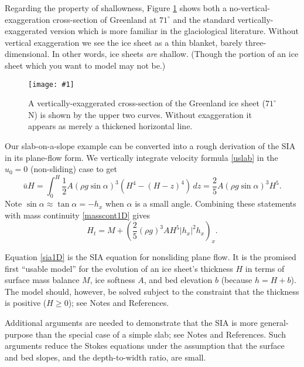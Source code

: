 \documentclass[letterpaper,final,12pt,reqno]{amsart}
\newcommand{\onefigsize}[3]{
\begin{figure}[ht]
\centering
\texttt{[image: \#1]}
\caption{#2}
\label{fig:#1}
\end{figure}}
\begin{document}
Regarding the property of shallowness, Figure \ref{fig:green-transect} shows both a no-vertical-exaggeration cross-section of Greenland at $71^\circ$ and the standard vertically-exaggerated version which is more familiar in the glaciological literature.  Without vertical exaggeration we see the ice sheet as a thin blanket, barely three-dimensional.  In other words, ice sheets \emph{are} shallow.  (Though the portion of an ice sheet which you want to model may not be.)

\onefigsize{green-transect}{A vertically-exaggerated cross-section of the Greenland ice sheet ($71^\circ$ N) is shown by the upper two curves.  Without exaggeration it appears as merely a thickened horizontal line.}{3.5in}

Our slab-on-a-slope example can be converted into a rough derivation of the SIA in its plane-flow form.  We vertically integrate velocity formula \eqref{uslab} in the $u_0=0$ (non-sliding) case to get
\begin{equation}
\bar u H = \int_0^H \frac{1}{2} A (\rho g \sin\alpha)^3  \left(H^4 - (H-z)^4\right)\,dz = \frac{2}{5} A (\rho g \sin\alpha)^3 H^5. \label{siaubar}
\end{equation}
Note $\sin \alpha \approx \tan\alpha = - h_x$ when $\alpha$ is a small angle.  Combining these statements with mass continuity \eqref{masscont1D} gives
\begin{equation}
  H_t = M + \left(\frac{2}{5} (\rho g)^3 A H^5 |h_x|^2 h_x\right)_x. \label{sia1D}
\end{equation}

Equation \eqref{sia1D} is the SIA equation for nonsliding plane flow.  It is the promised first ``usable model'' for the evolution of an ice sheet's thickness $H$ in terms of surface mass balance $M$, ice softness $A$, and bed elevation $b$ (because $h=H+b$).  The model should, however, be solved subject to the constraint that the thickness is positive ($H\ge 0$); see Notes and References.

Additional arguments are needed to demonstrate that the SIA is more general-purpose than the special case of a simple slab; see Notes and References.  Such arguments reduce the Stokes equations under the assumption that the surface and bed slopes, and the depth-to-width ratio, are small.
\end{document}
